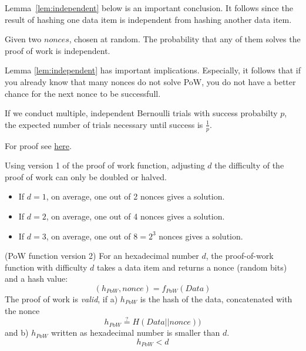 Lemma~\ref{lem:independent} below is an important conclusion. It follows since the result of hashing one data item is independent from hashing another data item.

\begin{lem}\label{lem:independent}
	Given two $nonces$, chosen at random. 
	The probability that any of them solves the proof of work is independent.
\end{lem}

\begin{note}
Lemma \ref{lem:independent} has important implications. Especially, it follows that
if you already know that many nonces do not solve PoW, you do not have a better chance for the next nonce to be successfull.
\end{note}


\begin{theorem}
	\label{thm:bernoullitrials}
	If we conduct multiple, independent Bernoulli trials with success probabilty $p$, the expected number of trials necessary until success is $\frac{1}{p}$. 
\end{theorem}

For proof see \href{https://cut-the-knot.org/Probability/LengthToFirstSuccess.shtml}{here}.



\begin{note}
Using version 1 of the proof of work function, adjusting $d$ the difficulty of the proof of work can only be doubled or halved. 
\begin{itemize}
	\item If $d=1$, on average, one out of 2 nonces gives a solution.
	\item If $d=2$, on average, one out of 4 nonces gives a solution.
	\item If $d=3$, on average, one out of $8=2^3$ nonces gives a solution.
\end{itemize}
\end{note}

\begin{definition}\label{def:pow}
	(PoW function version 2)
	For an hexadecimal number $d$,
	the proof-of-work function with difficulty $d$ takes a data item and returns a nonce (random bits) and a hash value:
	\[
		(h_{PoW}, nonce)=f_{PoW}(Data)
	\]
	The proof of work is \emph{valid}, if a) $h_{PoW}$ is the hash of the data, concatenated with the nonce
	\[
		h_{PoW} \overset{?}{=}H(Data || nonce))
	\]
	and b)  $h_{PoW}$ written as hexadecimal number is smaller than $d$.
	\[
		h_{PoW} < d
	\]
\end{definition}

